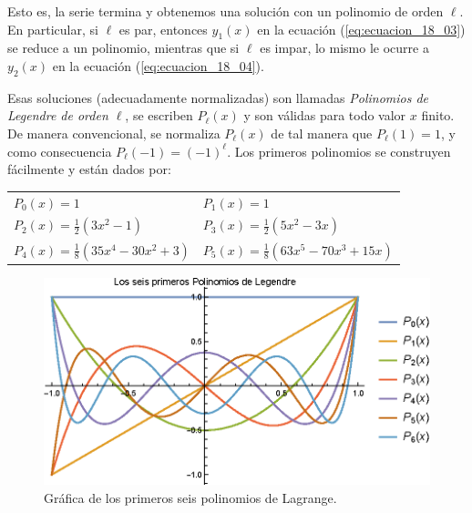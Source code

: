Esto es, la serie termina y obtenemos una solución con un polinomio de orden $\ell$. En particular, si $\ell$ es par, entonces $y_{1}(x)$ en la ecuación (\ref{eq:ecuacion_18_03}) se reduce a un polinomio, mientras que si $\ell$ es impar, lo mismo le ocurre a $y_{2}(x)$ en la ecuación (\ref{eq:ecuacion_18_04}).
\par
Esas soluciones (adecuadamente normalizadas) son llamadas \emph{Polinomios de Legendre de orden $\ell$}, se escriben $P_{\ell}(x)$ y son válidas para todo valor $x$ finito. De manera convencional, se normaliza $P_{\ell}(x)$ de tal manera que $P_{\ell}(1) =  1$, y como consecuencia $P_{\ell}(-1) = (-1)^{\ell}$. Los primeros polinomios se construyen fácilmente y están dados por:
\begin{center}
\begin{tabular}{l l}
$P_{0}(x) = 1 $ & $P_{1}(x) = 1 $ \\[0.5em]
$P_{2}(x) = \frac{1}{2} (3 x^{2} - 1)$ & $P_{3}(x) = \frac{1}{2} (5 x^{2} - 3 x)$ \\[0.5em] 
$P_{4}(x) = \frac{1}{8} (35 x^{4} - 30 x^{2} + 3)$ & $P_{5}(x) = \frac{1}{8} (63 x^{5} - 70 x^{3} + 15 x)$
\end{tabular}

\end{center}
\begin{figure}[H]
    \centering
    \includegraphics[scale=1.3]{Imagenes/Plot_Lagrange_0-6.eps}
    \caption{Gráfica de los primeros seis polinomios de Lagrange.}
    \label{fig:polinomios_Lagrange_01}
\end{figure}


